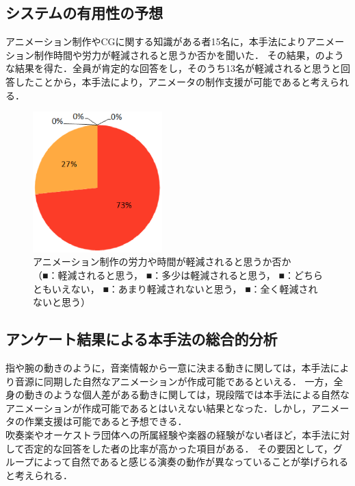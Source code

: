 \subsection{システムの有用性の予想}
アニメーション制作やCGに関する知識がある者15名に，本手法によりアニメーション制作時間や労力が軽減されると思うか否かを聞いた．
その結果，のような結果を得た．全員が肯定的な回答をし，そのうち13名が軽減されると思うと回答したことから，本手法により，アニメータの制作支援が可能であると考えられる．
\begin{figure}[!h]
	\centering
	\includegraphics[width=5cm]{fig/chap4/ans2.eps}
	\caption{アニメーション制作の労力や時間が軽減されると思うか否か\\
		（{\color{legend1}■}：軽減されると思う，
		{\color{legend2}■}：多少は軽減されると思う，
		{\color{legend3}■}：どちらともいえない，
		{\color{legend4}■}：あまり軽減されないと思う，
		{\color{legend5}■}：全く軽減されないと思う）}
	\label{fig:ans2}
\end{figure}
\newpage
\subsection{アンケート結果による本手法の総合的分析}
指や腕の動きのように，音楽情報から一意に決まる動きに関しては，本手法により音源に同期した自然なアニメーションが作成可能であるといえる．
一方，全身の動きのような個人差がある動きに関しては，現段階では本手法による自然なアニメーションが作成可能であるとはいえない結果となった．しかし，アニメータの作業支援は可能であると予想できる．\\
\indent
吹奏楽やオーケストラ団体への所属経験や楽器の経験がない者ほど，本手法に対して否定的な回答をした者の比率が高かった項目がある．
その要因として，グループによって自然であると感じる演奏の動作が異なっていることが挙げられると考えられる．